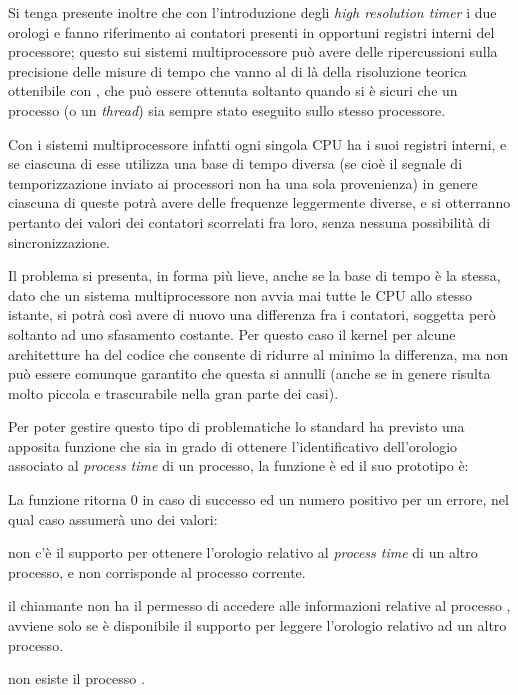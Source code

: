 Si tenga presente inoltre che con l'introduzione degli \textit{high resolution
  timer} i due orologi  e
 fanno riferimento ai contatori presenti in
opportuni registri interni del processore; questo sui sistemi multiprocessore
può avere delle ripercussioni sulla precisione delle misure di tempo che vanno
al di là della risoluzione teorica ottenibile con , che
può essere ottenuta soltanto quando si è sicuri che un processo (o un
\textit{thread}) sia sempre stato eseguito sullo stesso processore.

Con i sistemi multiprocessore infatti ogni singola CPU ha i suoi registri
interni, e se ciascuna di esse utilizza una base di tempo diversa (se cioè il
segnale di temporizzazione inviato ai processori non ha una sola provenienza)
in genere ciascuna di queste potrà avere delle frequenze leggermente diverse,
e si otterranno pertanto dei valori dei contatori scorrelati fra loro, senza
nessuna possibilità di sincronizzazione.

Il problema si presenta, in forma più lieve, anche se la base di tempo è la
stessa, dato che un sistema multiprocessore non avvia mai tutte le CPU allo
stesso istante, si potrà così avere di nuovo una differenza fra i contatori,
soggetta però soltanto ad uno sfasamento costante. Per questo caso il kernel
per alcune architetture ha del codice che consente di ridurre al minimo la
differenza, ma non può essere comunque garantito che questa si annulli (anche
se in genere risulta molto piccola e trascurabile nella gran parte dei casi).

Per poter gestire questo tipo di problematiche lo standard ha previsto una
apposita funzione che sia in grado di ottenere l'identificativo dell'orologio
associato al \textit{process time} di un processo, la funzione è
 ed il suo prototipo è:

\begin{funcproto}{
}

{La funzione ritorna $0$ in caso di successo ed un numero positivo per un
  errore, nel qual caso  assumerà uno dei valori:
  \begin{errlist}
  \item[\errcode{ENOSYS}] non c'è il supporto per ottenere l'orologio relativo
    al \textit{process time} di un altro processo, e  non
    corrisponde al processo corrente.
  \item[\errcode{EPERM}] il chiamante non ha il permesso di accedere alle
    informazioni relative al processo , avviene solo se è
    disponibile il supporto per leggere l'orologio relativo ad un altro
    processo.
  \item[\errcode{ESRCH}] non esiste il processo .
  \end{errlist}
}
\end{funcproto}

